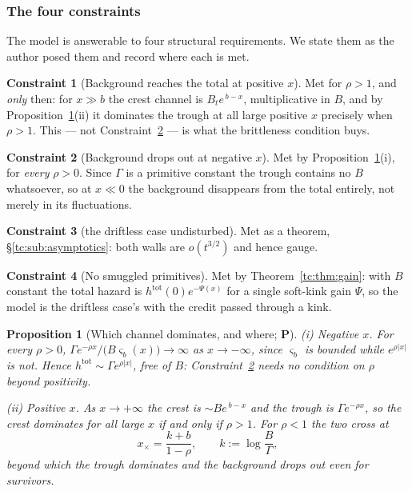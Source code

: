 \documentclass[11pt]{article}
\numberwithin{equation}{section}
\theoremstyle{plain}
\newtheorem{proposition}[theorem]{Proposition}
\theoremstyle{definition}
\newtheorem{constraint}{Constraint}
\theoremstyle{remark}
\begin{document}
\subsubsection{The four constraints}\label{tc:subsub:constraints}

The model is answerable to four structural requirements. We state them
as the author posed them and record where each is met.

\begin{constraint}[Background reaches the total at positive $x$]
\label{tc:C1}
Met for $\rho>1$, and \emph{only} then: for $x\gg b$ the crest channel
is $B_te^{\,b-x}$, multiplicative in $B$, and by
Proposition~\ref{tc:prop:dropout}(ii) it dominates the trough at all
large positive $x$ precisely when $\rho>1$. This --- not
Constraint~\ref{tc:C2} --- is what the brittleness condition buys.
\end{constraint}

\begin{constraint}[Background drops out at negative $x$]\label{tc:C2}
Met by Proposition~\ref{tc:prop:dropout}(i), for \emph{every} $\rho>0$.
Since $\Gamma$ is a primitive constant the trough contains no $B$
whatsoever, so at $x\ll0$ the background disappears from the total
entirely, not merely in its fluctuations.
\end{constraint}

\begin{constraint}[the driftless case undisturbed]\label{tc:C3}
Met as a theorem, \S\ref{tc:sub:asymptotics}: both walls are
$o(t^{3/2})$ and hence gauge.
\end{constraint}

\begin{constraint}[No smuggled primitives]\label{tc:C4}
Met by Theorem~\ref{tc:thm:gain}: with $B$ constant the total hazard is
$h^{\mathrm{tot}}(0)e^{-\Psi(x)}$ for a single soft-kink gain $\Psi$, so
the model is the driftless case's with the credit passed through a kink.
\end{constraint}

\begin{proposition}[Which channel dominates, and where; \textbf{P}]
\label{tc:prop:dropout}
\emph{(i) Negative $x$.} For every $\rho>0$,
$\Gamma e^{-\rho x}/\bigl(B\varsigma_b(x)\bigr)\to\infty$ as
$x\to-\infty$, since $\varsigma_b$ is bounded while $e^{\rho|x|}$ is
not. Hence $h^{\mathrm{tot}}\sim\Gamma e^{\rho|x|}$, free of $B$:
Constraint~\ref{tc:C2} needs no condition on $\rho$ beyond positivity.

\emph{(ii) Positive $x$.} As $x\to+\infty$ the crest is
$\sim Be^{\,b-x}$ and the trough is $\Gamma e^{-\rho x}$, so the crest
dominates for all large $x$ if and only if $\rho>1$. For $\rho<1$ the
two cross at
\begin{equation}\label{tc:eq:crossover}
x_{\times}=\frac{k+b}{1-\rho},\qquad k:=\log\frac{B}{\Gamma},
\end{equation}
beyond which the trough dominates and the background drops out
\emph{even for survivors}.
\end{proposition}
\end{document}
